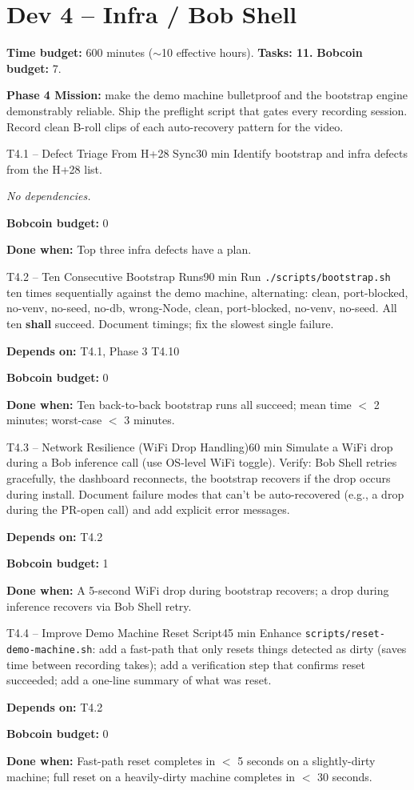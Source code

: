 \documentclass[11pt,letterpaper]{article}
\newcommand{\acceptance}[1]{\par\smallskip\textcolor{ibmgreen}{\textbf{Done when:}} #1}
\newcommand{\depends}[1]{\par\smallskip\textcolor{ibmorange}{\textbf{Depends on:}} #1}
\newcommand{\nodep}{\par\smallskip\textcolor{ibmgray}{\textit{No dependencies.}}}
\newcommand{\bobcost}[1]{\par\smallskip\textcolor{ibmaccent}{\textbf{Bobcoin budget:}} #1}
\newcommand{\shall}{\textbf{shall}}
\begin{document}
\section{Dev 4 -- Infra / Bob Shell}

\textbf{Time budget:} 600 minutes (${\sim}$10 effective hours). \textbf{Tasks: 11.} \textbf{Bobcoin budget:} 7.

\textbf{Phase 4 Mission:} make the demo machine bulletproof and the bootstrap engine demonstrably reliable. Ship the preflight script that gates every recording session. Record clean B-roll clips of each auto-recovery pattern for the video.

\begin{task}{T4.1 -- Defect Triage From H+28 Sync}{30 min}
Identify bootstrap and infra defects from the H+28 list.
\nodep
\bobcost{0}
\acceptance{Top three infra defects have a plan.}
\end{task}

\begin{task}{T4.2 -- Ten Consecutive Bootstrap Runs}{90 min}
Run \texttt{./scripts/bootstrap.sh} ten times sequentially against the demo machine, alternating: clean, port-blocked, no-venv, no-seed, no-db, wrong-Node, clean, port-blocked, no-venv, no-seed. All ten \shall{} succeed. Document timings; fix the slowest single failure.
\depends{T4.1, Phase 3 T4.10}
\bobcost{0}
\acceptance{Ten back-to-back bootstrap runs all succeed; mean time $<$ 2 minutes; worst-case $<$ 3 minutes.}
\end{task}

\begin{task}{T4.3 -- Network Resilience (WiFi Drop Handling)}{60 min}
Simulate a WiFi drop during a Bob inference call (use OS-level WiFi toggle). Verify: Bob Shell retries gracefully, the dashboard reconnects, the bootstrap recovers if the drop occurs during install. Document failure modes that can't be auto-recovered (e.g., a drop during the PR-open call) and add explicit error messages.
\depends{T4.2}
\bobcost{1}
\acceptance{A 5-second WiFi drop during bootstrap recovers; a drop during inference recovers via Bob Shell retry.}
\end{task}

\begin{task}{T4.4 -- Improve Demo Machine Reset Script}{45 min}
Enhance \texttt{scripts/reset-demo-machine.sh}: add a fast-path that only resets things detected as dirty (saves time between recording takes); add a verification step that confirms reset succeeded; add a one-line summary of what was reset.
\depends{T4.2}
\bobcost{0}
\acceptance{Fast-path reset completes in $<$ 5 seconds on a slightly-dirty machine; full reset on a heavily-dirty machine completes in $<$ 30 seconds.}
\end{task}
\end{document}
